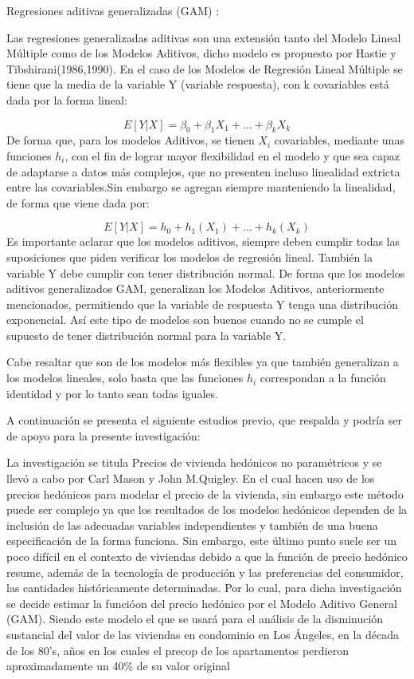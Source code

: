\documentclass[
  oneside]{memoir}
\begin{document}
Regresiones aditivas generalizadas (GAM) :

Las regresiones generalizadas aditivas son una extensión tanto del
Modelo Lineal Múltiple como de los Modelos Aditivos, dicho modelo es
propuesto por Hastie y Tibshirani(1986,1990). En el caso de los Modelos
de Regresión Lineal Múltiple se tiene que la media de la variable Y
(variable respuesta), con k covariables está dada por la forma lineal:

\[E[Y|X]= \beta _0 + \beta _1 X_1 + ... + \beta _k X_k\] De forma que,
para los modelos Aditivos, se tienen \(X_i\) covariables, mediante unas
funciones \(h_i\), con el fin de lograr mayor flexibilidad en el modelo
y que sea capaz de adaptarse a datos más complejos, que no presenten
incluso linealidad extricta entre las covariables.Sin embargo se agregan
siempre manteniendo la linealidad, de forma que viene dada por:

\[E[Y|X] = h_0 + h_1(X_1) + ... + h_k (X_k)\] Es importante aclarar que
los modelos aditivos, siempre deben cumplir todas las suposiciones que
piden verificar los modelos de regresión lineal. También la variable Y
debe cumplir con tener distribución normal. De forma que los modelos
aditivos generalizados GAM, generalizan los Modelos Aditivos,
anteriormente mencionados, permitiendo que la variable de respuesta Y
tenga una distribución exponencial. Así este tipo de modelos son buenos
cuando no se cumple el supuesto de tener distribución normal para la
variable Y.

Cabe resaltar que son de los modelos más flexibles ya que también
generalizan a los modelos lineales, solo basta que las funciones \(h_i\)
correspondan a la función identidad y por lo tanto sean todas iguales.

A continuación se presenta el siguiente estudios previo, que respalda y
podría ser de apoyo para la presente investigación:

La investigación se titula Precios de vivienda hedónicos no paramétricos
y se llevó a cabo por Carl Mason y John M.Quigley. En el cual hacen uso
de los precios hedónicos para modelar el precio de la vivienda, sin
embargo este método puede ser complejo ya que los resultados de los
modelos hedónicos dependen de la inclusión de las adecuadas variables
independientes y también de una buena especificación de la forma
funciona. Sin embargo, este último punto suele ser un poco difícil en el
contexto de viviendas debido a que la función de precio hedónico resume,
además de la tecnología de producción y las preferencias del consumidor,
las cantidades históricamente determinadas. Por lo cual, para dicha
investigación se decide estimar la funcióon del precio hedónico por el
Modelo Aditivo General (GAM). Siendo este modelo el que se usará para el
análisis de la disminución sustancial del valor de las viviendas en
condominio en Los Ángeles, en la década de los 80's, años en los cuales
el precop de los apartamentos perdieron aproximadamente un 40\% de su
valor original

\printbibliography

\backmatter
\end{document}

